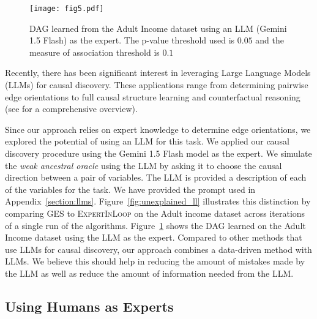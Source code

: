 \documentclass{uai2025} %
\begin{document}
\begin{figure}[t!]
	\centering
	\texttt{[image: fig5.pdf]}
	\caption{DAG learned from the Adult Income dataset using an LLM
		(Gemini 1.5 Flash) as the expert. The p-value threshold used is $ 0.05 $ 
		and the measure of association threshold is $ 0. 1 $}
	\label{fig:adult_llm}
\end{figure}

Recently, there has been significant interest in leveraging Large Language
Models (LLMs) for causal discovery. These applications range from determining
pairwise edge orientations \citep{Kiciman2023, Jin2024} to full causal
structure learning \citep{Naik2023, Vashishtha2023} and counterfactual
reasoning \citep{Kiciman2023} (see \citet{Liu2024} for a comprehensive
overview).

Since our approach relies on expert knowledge to determine edge orientations,
we explored the potential of using an LLM for this task. We applied our causal
discovery procedure using the Gemini 1.5 Flash model as the expert. We simulate
the \emph{weak ancestral oracle} using the LLM by asking it to choose the
causal direction between a pair of variables. The LLM is provided a description
of each of the variables for the task. We have provided the prompt used in
Appendix~\ref{section:llms}. 
Figure~\ref{fig:unexplained_ll} illustrates this distinction by comparing GES
to \textsc{ExpertInLoop} on the Adult income dataset across iterations of a
single run of the algorithms.
Figure~\ref{fig:adult_llm} shows the DAG learned
on the Adult Income dataset using the LLM as the expert. Compared to other
methods that use LLMs for causal discovery, our approach combines a data-driven
method with LLMs. We believe this should help in reducing the amount of
mistakes made by the LLM as well as reduce the amount of information needed
from the LLM.


\subsection{Using Humans as Experts}
\end{document}
